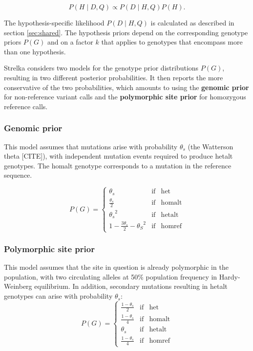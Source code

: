 \documentclass{article}
\begin{document}
\begin{equation*}
\label{eq:posterior}
P(H \mid D,Q) \propto P(D \mid H,Q)P(H).
\end{equation*}

The hypothesis-specific likelihood $P(D \mid H,Q)$ is calculated as described in section \ref{sec:shared}. The hypothesis priors depend on the corresponding genotype priors $P(G)$ and on a factor $k$ that applies to genotypes that encompass more than one hypothesis.

Strelka considers two models for the genotype prior distributions $P(G)$, resulting in two different posterior probabilities. It then reports the more conservative of the two probabilities, which amounts to using the {\bf genomic prior} for non-reference variant calls and the {\bf polymorphic site prior} for homozygous reference calls.

\subsubsection{Genomic prior}
\label{sec:germline_genomic_prior}
This model assumes that mutations arise with probability $\theta_s$ (the Watterson theta [CITE]), with independent mutation events required to produce hetalt genotypes. The homalt genotype corresponds to a mutation in the reference sequence.

\begin{equation*}
P(G) = \left\{
\begin{array}{lcl}
\theta_s & \mathrm{if} & \mathrm{het}\\
\frac{\theta_s}{2} & \mathrm{if} & \mathrm{homalt}\\
{\theta_s}^2 & \mathrm{if} & \mathrm{hetalt}\\
1-\frac{3\theta_s}{2}-{\theta_S}^2 & \mathrm{if} & \mathrm{homref}
\end{array} \right.
\end{equation*}

\subsubsection{Polymorphic site prior}
This model assumes that the site in question is already polymorphic in the population, with two circulating alleles at 50\% population frequency in Hardy-Weinberg equilibrium. In addition, secondary mutations resulting in hetalt genotypes can arise with probability $\theta_s$:
\begin{equation*}
P(G) = \left\{
\begin{array}{lcl}
\frac{1-\theta_s}{2} & \mathrm{if} & \mathrm{het}\\
\frac{1-\theta_s}{4} & \mathrm{if} & \mathrm{homalt}\\
\theta_s & \mathrm{if} & \mathrm{hetalt}\\
\frac{1-\theta_s}{4} & \mathrm{if} & \mathrm{homref}
\end{array} \right.
\end{equation*}
\end{document}
